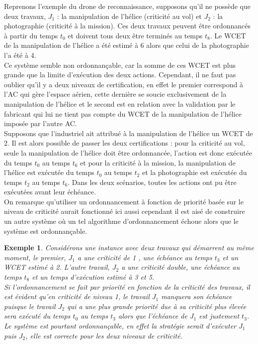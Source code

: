 \documentclass[a4paper]{report}
\theoremstyle{break}
\newtheorem{exem}{Exemple}
\begin{document}
Reprenons l'exemple du drone de reconnaissance, supposons qu'il ne possède que deux travaux, $J_1$ : la manipulation de l'hélice (criticité au vol) et  $J_2$ : la photographie (criticité à la mission). Ces deux travaux peuvent être ordonnancés à partir du temps $t_0$ et doivent tous deux être terminés au temps $t_8$. Le WCET de la manipulation de l'hélice a été estimé à 6 alors que celui de la photographie l'a été à 4.\\

Ce système semble non ordonnançable, car la somme de ces WCET est plus grande que la limite d'exécution des deux actions. Cependant, il ne faut pas oublier qu'il y a deux niveaux de certification, en effet le premier correspond à l'AC qui gère l'espace aérien, cette dernière se soucie exclusivement de la manipulation de l'hélice et le second est en relation avec la validation par le fabricant qui lui ne tient pas compte du WCET de la manipulation de l'hélice imposée par l'autre AC.\\
Supposons que l'industriel ait attribué à la manipulation de l'hélice un WCET de 2. Il est alors possible de passer les deux certifications : pour la criticité au vol, seule la manipulation de l'hélice doit être ordonnancée, l'action est donc exécutée du temps $t_0$ au temps $t_6$ et pour la criticité à la mission, la manipulation de l'hélice est exécutée du temps $t_0$ au temps $t_2$ et la photographie est exécutée du temps $t_2$ au temps $t_6$. Dans les deux scénarios, toutes les actions ont pu être exécutées avant leur échéance.\\

On remarque qu'utiliser un ordonnancement à fonction de priorité basée sur le niveau de criticité aurait fonctionné ici aussi cependant il est aisé de construire un autre système où un tel algorithme d'ordonnancement échoue alors que le système est ordonnançable.

\begin{exem}
Considérons une instance avec deux travaux qui démarrent au même moment, le premier, $J_1$ a une criticité de 1 , une échéance au temps $t_3$ et un WCET estimé à 2. L'autre travail, $J_2$ a une criticité double, une échéance au temps $t_8$ et un temps d'exécution estimé à 3 et 5.\\
Si l'ordonnancement se fait par priorité en fonction de la criticité des travaux, il est évident qu'en criticité de niveau 1, le travail $J_1$ manquera son échéance puisque le travail $J_2$ qui a une plus grande priorité due à sa criticité plus élevée sera exécuté du temps $t_0$ au temps $t_3$ alors que l'échéance de $J_1$ est justement $t_3$.\\
Le système est pourtant ordonnançable, en effet la stratégie serait d'exécuter $J_1$ puis $J_2$, elle est correcte pour les deux niveaux de criticité.
\end{exem}
\end{document}
